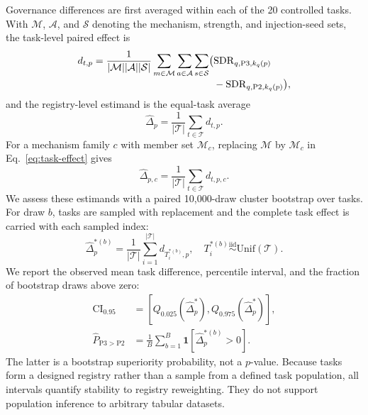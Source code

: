 \documentclass[sigconf,review]{acmart}
\begin{document}
Governance differences are first averaged within each of the 20 controlled
tasks. With $\mathcal{M}$, $\mathcal{A}$, and $\mathcal{S}$ denoting the
mechanism, strength, and injection-seed sets, the task-level paired effect is
\begin{equation}
\begin{split}
 d_{t,p}={1\over|\mathcal{M}||\mathcal{A}||\mathcal{S}|}
 \sum_{m\in\mathcal{M}}\sum_{a\in\mathcal{A}}\sum_{s\in\mathcal{S}}
 \bigl(&\mathrm{SDR}_{q,\mathrm{P3},k_q(p)}\\[-2pt]
       &-\mathrm{SDR}_{q,\mathrm{P2},k_q(p)}\bigr),
\end{split}
 \label{eq:task-effect}
\end{equation}
and the registry-level estimand is the equal-task average
\begin{equation}
 \widehat{\Delta}_p=\frac{1}{|\mathcal{T}|}
 \sum_{t\in\mathcal{T}}d_{t,p}.
 \label{eq:registry-effect}
\end{equation}
For a mechanism family $c$ with member set $\mathcal{M}_c$, replacing
$\mathcal{M}$ by $\mathcal{M}_c$ in Eq.~\ref{eq:task-effect} gives
\begin{equation}
 \widehat{\Delta}_{p,c}=\frac{1}{|\mathcal{T}|}
 \sum_{t\in\mathcal{T}}d_{t,p,c}.
 \label{eq:family-effect}
\end{equation}
We assess these estimands with a paired 10,000-draw cluster bootstrap over
tasks. For draw $b$, tasks are sampled with replacement and the complete task
effect is carried with each sampled index:
\begin{equation}
 \widehat{\Delta}^{*(b)}_p
 =\frac{1}{|\mathcal{T}|}\sum_{i=1}^{|\mathcal{T}|}
 d_{T_i^{*(b)},p},
 \quad T_i^{*(b)}\stackrel{\mathrm{iid}}{\sim}\mathrm{Unif}(\mathcal{T}).
 \label{eq:cluster-bootstrap}
\end{equation}
We report the observed mean task difference, percentile interval, and the
fraction of bootstrap draws above zero:
\begin{equation}
\begin{split}
 \mathrm{CI}_{0.95}
 &=\left[Q_{0.025}(\widehat{\Delta}^{*}_p),
          Q_{0.975}(\widehat{\Delta}^{*}_p)\right],\\
 \widehat{P}_{\mathrm{P3>P2}}
 &=\frac{1}{B}\sum_{b=1}^{B}\mathbf{1}
   [\widehat{\Delta}^{*(b)}_p>0].
\end{split}
 \label{eq:bootstrap-summary}
\end{equation}
The latter is a bootstrap superiority probability, not a $p$-value. Because
tasks form a designed registry rather than
a sample from a defined task population, all intervals quantify stability to
registry reweighting. They do not support population inference to arbitrary
tabular datasets.
\end{document}
